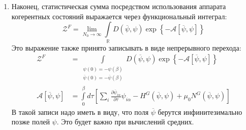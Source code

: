 \begin{enumerate}
	\item Наконец, статистическая сумма посредством использования аппарата когерентных состояний \cite{Altland_Simons} выражается через функциональный интеграл:
	\begin{equation}
		\label{eq:Part_sum_discretized}
		\mathcal{Z}^{F} = \lim_{N_0 \rightarrow \infty} \int \limits_{\mathbb{R}} D\left(\overline{\psi}, \psi\right) \exp\left\{ - \mathcal{A} \left[\overline{\psi}, \psi\right] \right\}
	\end{equation}
	Это выражение также принято записывать в виде непрерывного перехода:
	\begin{align}
		\label{eq:Part_sum_func_int}
		\mathcal{Z}^{F} & = \int \limits_{ \begin{array}{cc}
			\psi(0) = - \psi(\beta)\\
			\overline{\psi}(0) = - \overline{\psi}(\beta)
			\end{array} } 
		D\left(\overline{\psi},\psi\right) \exp\left\{ -\mathcal{A} \left[\overline{\psi}, \psi\right] \right\} \\
		\label{eq:Action}
		\mathcal{A} \left[\overline{\psi}, \psi\right] & = \int\limits_{0}^{\beta} d\tau \left[\sum_{i} \frac{\partial \overline{\psi}_{i\alpha} }{ \partial \tau } \psi_{i\alpha} - H^{G}\left(\overline{\psi},\psi\right) + \mu_0 N^{G}\left(\overline{\psi},\psi\right) \right]
	\end{align}
	В такой записи надо иметь в виду, что поля $\overline{ \psi}$ берутся инфинитезимально позже полей $\psi$. Это будет важно при вычислений средних.
	

\end{enumerate}
